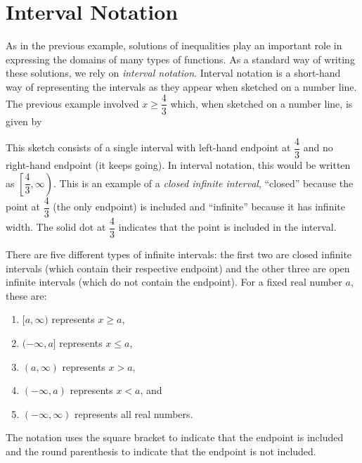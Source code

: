 \documentclass[nooutcomes]{ximera}
\begin{document}
	\section{Interval Notation}
	As in the previous example, solutions of inequalities play an important role in expressing the domains of many types of functions. As a standard way of writing these solutions, we rely on \emph{interval notation}. Interval notation
	is a short-hand way of representing the intervals as they appear when sketched on a number line. The previous example involved $x \geq \dfrac{4}{3}$ which, when sketched on a number line, is given by
	\begin{image}
	\end{image}
	This sketch consists of a single interval with left-hand endpoint at $\dfrac{4}{3}$ and no right-hand endpoint (it keeps going). In interval notation, this would be written as $\left[ \dfrac{4}{3}, \infty \right)$. This is an example of a \emph{closed infinite interval}, 
	``closed'' because the point at $\dfrac{4}{3}$ (the only endpoint) is included and ``infinite'' because it has infinite width. The solid dot at $\dfrac{4}{3}$ indicates that the point is included in the interval.
	
	There are five different types of infinite intervals: the first two are closed infinite intervals (which contain their respective endpoint) and the other three are open infinite intervals (which do not contain the endpoint). For a fixed real number $a$, these are:
	\begin{enumerate}
		\item $[a, \infty)$ represents $x \geq a$,
		\item $(-\infty, a]$ represents $x \leq a$,
		\item $(a, \infty)$ represents $x > a$, 
		\item $(-\infty, a)$ represents $x < a$, and
		\item $(-\infty, \infty)$ represents all real numbers.
	\end{enumerate}
	The notation uses the square bracket to indicate that the endpoint is included and the round parenthesis to indicate that the endpoint is not included. 
\end{document}

